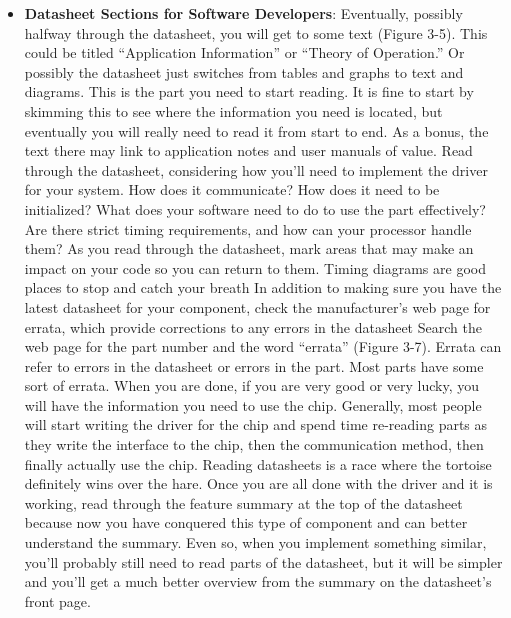 \documentclass{report}
\begin{document}
\begin{itemize}
        \item \textbf{Datasheet Sections for Software Developers}: Eventually, possibly halfway through the datasheet, you will get to some text (Figure 3-5). This could be titled “Application Information” or “Theory of Operation.” Or possibly the datasheet just switches from tables and graphs to text and diagrams. This is the part you need to start reading. It is fine to start by skimming this to see where the information you need is located, but eventually you will really need to read it from start to end. As a bonus, the text there may link to application notes and user manuals of value. Read through the datasheet, considering how you’ll need to implement the driver for your system. How does it communicate? How does it need to be initialized? What does your software need to do to use the part effectively? Are there strict timing requirements, and how can your processor handle them?
            \bigbreak \noindent 
            As you read through the datasheet, mark areas that may make an impact on your code so you can return to them. Timing diagrams are good places to stop and catch your breath
            \bigbreak \noindent 
            In addition to making sure you have the latest datasheet for your component, check the manufacturer’s web page for errata, which provide corrections to any errors in the datasheet
            \bigbreak \noindent 
            Search the web page for the part number and the word “errata” (Figure 3-7). Errata can refer to errors in the datasheet or errors in the part. Most parts have some sort of errata.
            \bigbreak \noindent 
            \bigbreak \noindent 
            When you are done, if you are very good or very lucky, you will have the information you need to use the chip. Generally, most people will start writing the driver for the chip and spend time re-reading parts as they write the interface to the chip, then the communication method, then finally actually use the chip. Reading datasheets is a race where the tortoise definitely wins over the hare.
            \bigbreak \noindent 
            Once you are all done with the driver and it is working, read through the feature summary at the top of the datasheet because now you have conquered this type of component and can better understand the summary. Even so, when you implement something similar, you’ll probably still need to read parts of the datasheet, but it will be simpler and you’ll get a much better overview from the summary on the datasheet’s front page.
            \bigbreak \noindent 

\end{itemize}
\end{document}

